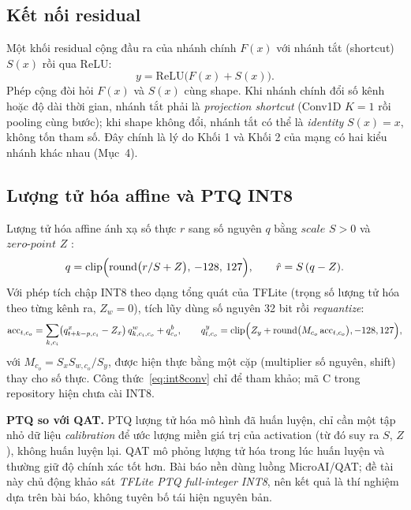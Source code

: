 \documentclass[12pt,a4paper]{article}
\begin{document}
\subsection{Kết nối residual}
Một khối residual \cite{he2016} cộng đầu ra của nhánh chính $F(x)$ với nhánh tắt (shortcut) $S(x)$ rồi qua ReLU:
\begin{equation}
y=\mathrm{ReLU}\bigl(F(x)+S(x)\bigr).
\label{eq:res}
\end{equation}
Phép cộng đòi hỏi $F(x)$ và $S(x)$ cùng shape. Khi nhánh chính đổi số kênh hoặc độ dài thời gian, nhánh tắt phải là \emph{projection shortcut} (Conv1D $K=1$ rồi pooling cùng bước); khi shape không đổi, nhánh tắt có thể là \emph{identity} $S(x)=x$, không tốn tham số. Đây chính là lý do Khối 1 và Khối 2 của mạng có hai kiểu nhánh khác nhau (Mục~4).

\subsection{Lượng tử hóa affine và PTQ INT8}
Lượng tử hóa affine ánh xạ số thực $r$ sang số nguyên $q$ bằng $scale$ $S>0$ và $zero\text{-}point$ $Z$ \cite{jacob2018,krishnamoorthi2018}:
\begin{equation}
q=\mathrm{clip}\Bigl(\mathrm{round}\bigl(r/S+Z\bigr),\,-128,\,127\Bigr),\qquad \hat r=S\,(q-Z).
\label{eq:quant}
\end{equation}
Với phép tích chập INT8 theo dạng tổng quát của TFLite (trọng số lượng tử hóa theo từng kênh ra, $Z_w=0$), tích lũy dùng số nguyên 32 bit rồi \emph{requantize}:
\begin{equation}
\mathrm{acc}_{t,c_o}=\sum_{k,c_i}\bigl(q^x_{t+k-p,c_i}-Z_x\bigr)\,q^w_{k,c_i,c_o}+q^b_{c_o},\qquad
q^y_{t,c_o}=\mathrm{clip}\Bigl(Z_y+\mathrm{round}\bigl(M_{c_o}\,\mathrm{acc}_{t,c_o}\bigr),-128,127\Bigr),
\label{eq:int8conv}
\end{equation}
với $M_{c_o}=S_xS_{w,c_o}/S_y$, được hiện thực bằng một cặp (multiplier số nguyên, shift) thay cho số thực. Công thức~\eqref{eq:int8conv} chỉ để tham khảo; mã C trong repository hiện chưa cài INT8.

\textbf{PTQ so với QAT.} PTQ lượng tử hóa mô hình đã huấn luyện, chỉ cần một tập nhỏ dữ liệu \emph{calibration} để ước lượng miền giá trị của activation (từ đó suy ra $S$, $Z$), không huấn luyện lại. QAT mô phỏng lượng tử hóa trong lúc huấn luyện và thường giữ độ chính xác tốt hơn. Bài báo nền dùng luồng MicroAI/QAT; đề tài này chủ động khảo sát \emph{TFLite PTQ full-integer INT8}, nên kết quả là thí nghiệm dựa trên bài báo, không tuyên bố tái hiện nguyên bản.
\end{document}
